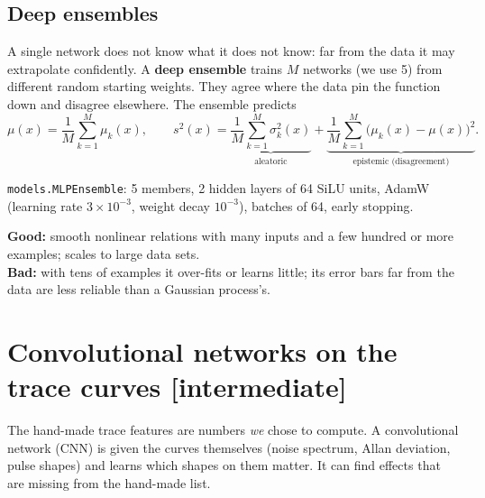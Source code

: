 \documentclass[11pt]{article}
\newcommand{\code}[1]{\texttt{#1}}
\newcommand{\level}[1]{\hfill{\normalfont\small\color{black!60}[#1]}}
\begin{document}
\subsection{Deep ensembles}
A single network does not know what it does not know: far from the data it may extrapolate confidently. A \textbf{deep ensemble}
trains $M$ networks (we use 5) from different random starting weights. They agree where the data pin the function down and disagree
elsewhere. The ensemble predicts
\begin{equation}
\mu(x) = \frac1M\sum_{k=1}^{M}\mu_k(x),\qquad
s^2(x) = \underbrace{\frac1M\sum_{k=1}^{M}\sigma_k^2(x)}_{\text{aleatoric}} + \underbrace{\frac1M\sum_{k=1}^{M}\bigl(\mu_k(x) - \mu(x)\bigr)^2}_{\text{epistemic (disagreement)}} .
\end{equation}

\begin{ours}
\code{models.MLPEnsemble}: 5 members, 2 hidden layers of 64 SiLU units, AdamW (learning rate $3\times10^{-3}$, weight decay
$10^{-3}$), batches of 64, early stopping.
\end{ours}

\begin{when}
\textbf{Good:} smooth nonlinear relations with many inputs and a few hundred or more examples; scales to large data sets.\\
\textbf{Bad:} with tens of examples it over-fits or learns little; its error bars far from the data are less reliable than a
Gaussian process's.
\end{when}

\section{Convolutional networks on the trace curves \level{intermediate}}
\label{sec:cnn}

\begin{idea}
The hand-made trace features are numbers \emph{we} chose to compute. A convolutional network (CNN) is given the curves themselves
(noise spectrum, Allan deviation, pulse shapes) and learns which shapes on them matter. It can find effects that are missing from
the hand-made list.
\end{idea}
\end{document}
